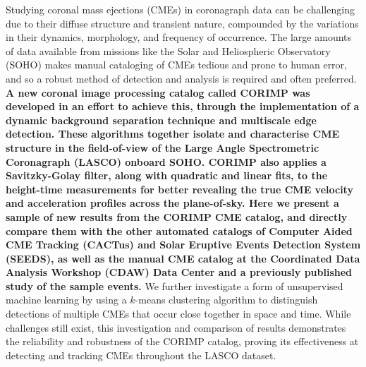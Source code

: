 \documentclass[referee,a4paper,12pt,traditabstract]{swsc}
\begin{document}
\begin{linenumbers}
  \abstract
  {
  Studying coronal mass ejections (CMEs) in coronagraph data can be challenging due to their diffuse structure and transient nature, compounded by the variations in their dynamics, morphology, and frequency of occurrence. The large amounts of data available from missions like the Solar and Heliospheric Observatory (SOHO) makes manual cataloging of CMEs tedious and prone to human error, and so a robust method of detection and analysis is required and often preferred. {\bf A new coronal image processing catalog called CORIMP was developed in an effort to achieve this, through the implementation of a dynamic background separation technique and multiscale edge detection. These algorithms together isolate and characterise CME structure in the field-of-view of the Large Angle Spectrometric Coronagraph (LASCO) onboard SOHO. CORIMP also applies a Savitzky-Golay filter, along with quadratic and linear fits, to the height-time measurements for better revealing the true CME velocity and acceleration profiles across the plane-of-sky. Here we present a sample of new results from the CORIMP CME catalog, and directly compare them with the other automated catalogs of Computer Aided CME Tracking (CACTus) and Solar Eruptive Events Detection System (SEEDS), as well as the manual CME catalog at the Coordinated Data Analysis Workshop (CDAW) Data Center and a previously published study of the sample events.} We further investigate a form of unsupervised machine learning by using a $k$-means clustering algorithm to distinguish detections of multiple CMEs that occur close together in space and time. While challenges still exist, this investigation and comparison of results demonstrates the reliability and robustness of the CORIMP catalog, proving its effectiveness at detecting and tracking CMEs throughout the LASCO dataset.
  }
  
   
   
   
   
   

\end{linenumbers}
\end{document}
